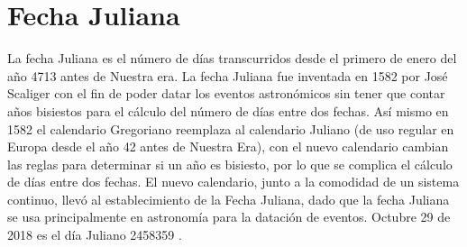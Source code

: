 \documentclass[12pt]{article}
\begin{document}
\section{Fecha Juliana}
La fecha Juliana es el número de días transcurridos desde el primero de enero del año 4713 antes de Nuestra era. La fecha Juliana fue inventada en 1582 por José Scaliger con el fin de poder datar los eventos astronómicos sin tener que contar años bisiestos para el cálculo del número de días entre dos fechas. Así mismo en 1582 el calendario Gregoriano reemplaza al calendario Juliano (de uso regular en Europa desde el año 42 antes de Nuestra Era), con el nuevo calendario cambian las reglas para determinar si un año es bisiesto, por lo que se complica el cálculo de días entre dos fechas. El nuevo calendario, junto a la comodidad de un sistema continuo, llevó al establecimiento de la Fecha Juliana, dado que la fecha Juliana se usa principalmente en astronomía para la datación de eventos. Octubre 29 de 2018 es el día Juliano 2458359 .

%

\end{document}
